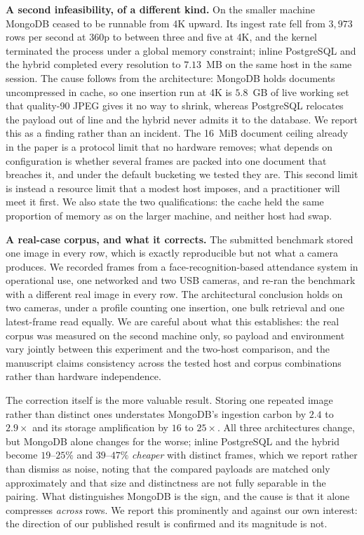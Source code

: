 \documentclass[11pt,a4paper]{article}
\begin{document}
\textbf{A second infeasibility, of a different kind.} On the smaller machine MongoDB ceased to be runnable
from 4K upward. Its ingest rate fell from $3{,}973$ rows per second at 360p to between three and five at 4K,
and the kernel terminated the process under a global memory constraint; inline PostgreSQL and the hybrid
completed every resolution to $7.13$~MB on the same host in the same session. The cause follows from the
architecture: MongoDB holds documents uncompressed in cache, so one insertion run at 4K is $5.8$~GB of live
working set that quality-90 JPEG gives it no way to shrink, whereas PostgreSQL relocates the payload out of
line and the hybrid never admits it to the database. We report this as a finding rather than an incident.
The 16~MiB document ceiling already in the paper is a protocol limit that no hardware removes; what
depends on configuration is whether several frames are packed into one document that breaches it, and under
the default bucketing we tested they are. This second limit is instead a resource limit that a modest host
imposes, and a practitioner will meet it first. We also state the two
qualifications: the cache held the same proportion of memory as on the larger machine, and neither host had
swap.

\textbf{A real-case corpus, and what it corrects.} The submitted benchmark stored one image in every row,
which is exactly reproducible but not what a camera produces. We recorded frames from a
face-recognition-based attendance system in operational use, one networked and two USB cameras, and re-ran
the benchmark with a different real image in every row. The architectural conclusion holds on two cameras,
under a profile counting one insertion, one bulk retrieval and one latest-frame read equally. We are careful
about what this establishes: the real corpus was measured on the second machine only, so payload and
environment vary jointly between this experiment and the two-host comparison, and the manuscript claims
consistency across the tested host and corpus combinations rather than hardware independence.

The correction itself is the more valuable result. Storing one repeated image rather than distinct ones
understates MongoDB's ingestion carbon by $2.4$ to $2.9\times$ and its storage amplification by $16$ to
$25\times$. All three architectures change, but MongoDB alone changes for the worse; inline PostgreSQL and
the hybrid become $19$--$25\%$ and $39$--$47\%$ \emph{cheaper} with distinct frames, which we report rather
than dismiss as noise, noting that the compared payloads are matched only approximately and that size and
distinctness are not fully separable in the pairing. What distinguishes MongoDB is the sign, and the cause is
that it alone compresses \emph{across} rows. We report this prominently and against our own interest: the
direction of our published result is confirmed and its magnitude is not.
\end{document}
